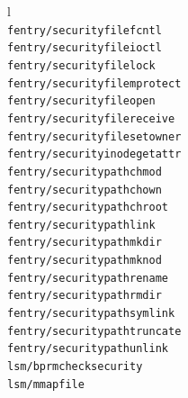 \begin{table}[t]
  \centering
  \small
  \caption{List of file system traced hook points}
  \label{table-fs-hooks}
  \begin{tabular}{ l }
    \toprule
    \\
    \midrule
    {\tt fentry/security\textunderscore file\textunderscore fcntl}                        \\
    {\tt fentry/security\textunderscore file\textunderscore ioctl}                        \\
    {\tt fentry/security\textunderscore file\textunderscore lock}                         \\
    {\tt fentry/security\textunderscore file\textunderscore mprotect}                     \\
    {\tt fentry/security\textunderscore file\textunderscore open}                         \\
    {\tt fentry/security\textunderscore file\textunderscore receive}                      \\
    {\tt fentry/security\textunderscore file\textunderscore set\textunderscore owner}     \\
    {\tt fentry/security\textunderscore inode\textunderscore getattr}                     \\         
    {\tt fentry/security\textunderscore path\textunderscore chmod}                        \\
    {\tt fentry/security\textunderscore path\textunderscore chown}                        \\
    {\tt fentry/security\textunderscore path\textunderscore chroot}                       \\
    {\tt fentry/security\textunderscore path\textunderscore link}                         \\            
    {\tt fentry/security\textunderscore path\textunderscore mkdir}                        \\    
    {\tt fentry/security\textunderscore path\textunderscore mknod}                        \\
    {\tt fentry/security\textunderscore path\textunderscore rename}                       \\
    {\tt fentry/security\textunderscore path\textunderscore rmdir}                        \\    
    {\tt fentry/security\textunderscore path\textunderscore symlink}                      \\
    {\tt fentry/security\textunderscore path\textunderscore truncate}                     \\
    {\tt fentry/security\textunderscore path\textunderscore unlink}                       \\
    {\tt lsm/bprm\textunderscore check\textunderscore security}                           \\
    {\tt lsm/mmap\textunderscore file}                                                    \\
    \bottomrule
  \end{tabular}
\end{table}


